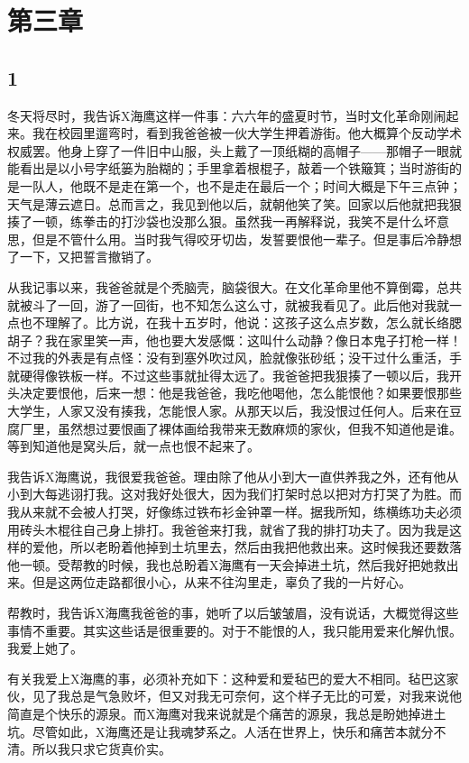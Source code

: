 \section{第三章}

\subsection{1}

冬天将尽时，我告诉X海鹰这样一件事：六六年的盛夏时节，当时文化革命刚闹起来。我在校园里遛弯时，看到我爸爸被一伙大学生押着游街。他大概算个反动学术权威罢。他身上穿了一件旧中山服，头上戴了一顶纸糊的高帽子——那帽子一眼就能看出是以小号字纸篓为胎糊的；手里拿着根棍子，敲着一个铁簸箕；当时游街的是一队人，他既不是走在第一个，也不是走在最后一个；时间大概是下午三点钟；天气是薄云遮日。总而言之，我见到他以后，就朝他笑了笑。回家以后他就把我狠揍了一顿，练拳击的打沙袋也没那么狠。虽然我一再解释说，我笑不是什么坏意思，但是不管什么用。当时我气得咬牙切齿，发誓要恨他一辈子。但是事后冷静想了一下，又把誓言撤销了。 

从我记事以来，我爸爸就是个秃脑壳，脑袋很大。在文化革命里他不算倒霉，总共就被斗了一回，游了一回街，也不知怎么这么寸，就被我看见了。此后他对我就一点也不理解了。比方说，在我十五岁时，他说：这孩子这么点岁数，怎么就长络腮胡子？我在家里笑一声，他也要大发感慨：这叫什么动静？像日本鬼子打枪一样！不过我的外表是有点怪：没有到塞外吹过风，脸就像张砂纸；没干过什么重活，手就硬得像铁板一样。不过这些事就扯得太远了。我爸爸把我狠揍了一顿以后，我开头决定要恨他，后来一想：他是我爸爸，我吃他喝他，怎么能恨他？如果要恨那些大学生，人家又没有揍我，怎能恨人家。从那天以后，我没恨过任何人。后来在豆腐厂里，虽然想过要恨画了裸体画给我带来无数麻烦的家伙，但我不知道他是谁。等到知道他是窝头后，就一点也恨不起来了。 

我告诉X海鹰说，我很爱我爸爸。理由除了他从小到大一直供养我之外，还有他从小到大每逃诩打我。这对我好处很大，因为我们打架时总以把对方打哭了为胜。而我从来就不会被人打哭，好像练过铁布衫金钟罩一样。据我所知，练横练功夫必须用砖头木棍往自己身上排打。我爸爸来打我，就省了我的排打功夫了。因为我是这样的爱他，所以老盼着他掉到土坑里去，然后由我把他救出来。这时候我还要数落他一顿。受帮教的时候，我也总盼着X海鹰有一天会掉进土坑，然后我好把她救出来。但是这两位走路都很小心，从来不往沟里走，辜负了我的一片好心。 

帮教时，我告诉X海鹰我爸爸的事，她听了以后皱皱眉，没有说话，大概觉得这些事情不重要。其实这些话是很重要的。对于不能恨的人，我只能用爱来化解仇恨。我爱上她了。 

有关我爱上X海鹰的事，必须补充如下：这种爱和爱毡巴的爱大不相同。毡巴这家伙，见了我总是气急败坏，但又对我无可奈何，这个样子无比的可爱，对我来说他简直是个快乐的源泉。而X海鹰对我来说就是个痛苦的源泉，我总是盼她掉进土坑。尽管如此，X海鹰还是让我魂梦系之。人活在世界上，快乐和痛苦本就分不清。所以我只求它货真价实。 

